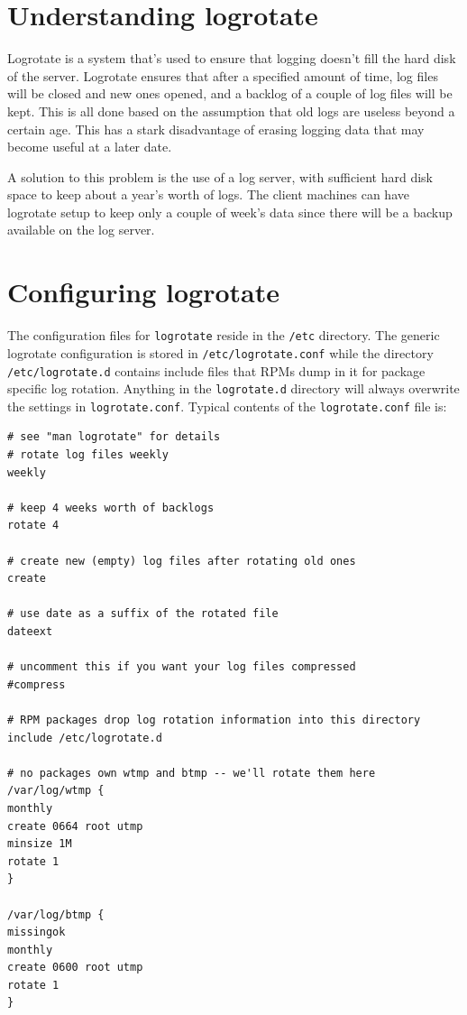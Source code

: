	\section{Understanding logrotate}
Logrotate is a system that's used to ensure that logging doesn't fill the hard disk of the server. Logrotate ensures that after a specified amount of time, log files will be closed and new ones opened, and a backlog of a couple of log files will be kept. This is all done based on the assumption that old logs are useless beyond a certain age. This has a stark disadvantage of erasing logging data that may become useful at a later date. 

A solution to this problem is the use of a log server, with sufficient hard disk space to keep about a year's worth of logs. The client machines can have logrotate setup to keep only a couple of week's data since there will be a backup available on the log server. 

\section{Configuring logrotate}
The configuration files for \verb|logrotate| reside in the \verb|/etc| directory. The generic logrotate configuration is stored in \verb|/etc/logrotate.conf| while the directory \verb|/etc/logrotate.d| contains include files that RPMs dump in it for package specific log rotation. Anything in the \verb|logrotate.d| directory will always overwrite the settings in \verb|logrotate.conf|. Typical contents of the \verb|logrotate.conf| file is:

\vspace{-15pt}
\begin{verbatim}
# see "man logrotate" for details
# rotate log files weekly
weekly

# keep 4 weeks worth of backlogs
rotate 4

# create new (empty) log files after rotating old ones
create

# use date as a suffix of the rotated file
dateext

# uncomment this if you want your log files compressed
#compress

# RPM packages drop log rotation information into this directory
include /etc/logrotate.d

# no packages own wtmp and btmp -- we'll rotate them here
/var/log/wtmp {
monthly
create 0664 root utmp
minsize 1M
rotate 1
}

/var/log/btmp {
missingok
monthly
create 0600 root utmp
rotate 1
}
\end{verbatim}
\vspace{-10pt}

